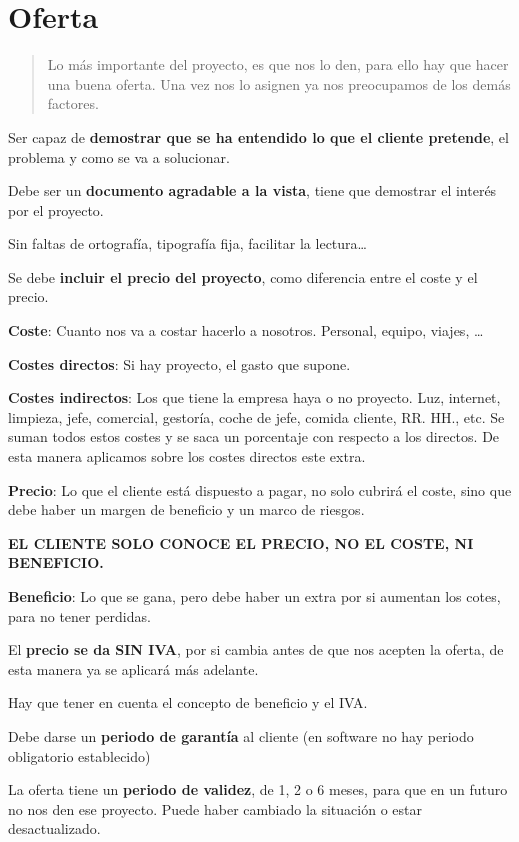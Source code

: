 \documentclass[12pt, twoside, openright]{report} %
\begin{document}
\section{Oferta}

\begin{quote}
Lo más importante del proyecto, es que nos lo den, para ello hay que
hacer una buena oferta. Una vez nos lo asignen ya nos preocupamos de los
demás factores.
\end{quote}

Ser capaz de \textbf{demostrar que se ha entendido lo que el cliente
pretende}, el problema y como se va a solucionar.

Debe ser un \textbf{documento agradable a la vista}, tiene que demostrar
el interés por el proyecto.

Sin faltas de ortografía, tipografía fija, facilitar la lectura\ldots{}

Se debe \textbf{incluir el precio del proyecto}, como diferencia entre
el coste y el precio.

\textbf{Coste}: Cuanto nos va a costar hacerlo a nosotros. Personal,
equipo, viajes, \ldots{}

\textbf{Costes directos}: Si hay proyecto, el gasto que supone.

\textbf{Costes indirectos}: Los que tiene la empresa haya o no proyecto.
Luz, internet, limpieza, jefe, comercial, gestoría, coche de jefe,
comida cliente, RR. HH., etc. Se suman todos estos costes y se saca un
porcentaje con respecto a los directos. De esta manera aplicamos sobre
los costes directos este extra.

\textbf{Precio}: Lo que el cliente está dispuesto a pagar, no solo
cubrirá el coste, sino que debe haber un margen de beneficio y un marco
de riesgos.

\textbf{EL CLIENTE SOLO CONOCE EL PRECIO, NO EL COSTE, NI BENEFICIO.}

\textbf{Beneficio}: Lo que se gana, pero debe haber un extra por si
aumentan los cotes, para no tener perdidas.

El \textbf{precio se da SIN IVA}, por si cambia antes de que nos acepten
la oferta, de esta manera ya se aplicará más adelante.

Hay que tener en cuenta el concepto de beneficio y el IVA.

Debe darse un \textbf{periodo de garantía} al cliente (en software no
hay periodo obligatorio establecido)

La oferta tiene un \textbf{periodo de validez}, de 1, 2 o 6 meses, para
que en un futuro no nos den ese proyecto. Puede haber cambiado la
situación o estar desactualizado.
\end{document}
